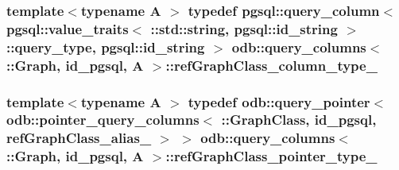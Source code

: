\subsubsection[{ref\+Graph\+Class\+\_\+column\+\_\+type\+\_\+}]{\setlength{\rightskip}{0pt plus 5cm}template$<$typename A $>$ typedef pgsql\+::query\+\_\+column$<$ pgsql\+::value\+\_\+traits$<$ \+::std\+::string, pgsql\+::id\+\_\+string $>$\+::query\+\_\+type, pgsql\+::id\+\_\+string $>$ odb\+::query\+\_\+columns$<$ \+::{\bf Graph}, id\+\_\+pgsql, A $>$\+::{\bf ref\+Graph\+Class\+\_\+column\+\_\+type\+\_\+}}\label{structodb_1_1query__columns_3_01_1_1_graph_00_01id__pgsql_00_01_a_01_4_a4acfad79ba5834b07df2fca207c93284}
\hypertarget{structodb_1_1query__columns_3_01_1_1_graph_00_01id__pgsql_00_01_a_01_4_a4b2c76decf6a3ad49cf2b4c10f5d0e41}{}
\subsubsection[{ref\+Graph\+Class\+\_\+pointer\+\_\+type\+\_\+}]{\setlength{\rightskip}{0pt plus 5cm}template$<$typename A $>$ typedef odb\+::query\+\_\+pointer$<$ odb\+::pointer\+\_\+query\+\_\+columns$<$ \+::{\bf Graph\+Class}, id\+\_\+pgsql, {\bf ref\+Graph\+Class\+\_\+alias\+\_\+} $>$ $>$ odb\+::query\+\_\+columns$<$ \+::{\bf Graph}, id\+\_\+pgsql, A $>$\+::{\bf ref\+Graph\+Class\+\_\+pointer\+\_\+type\+\_\+}}\label{structodb_1_1query__columns_3_01_1_1_graph_00_01id__pgsql_00_01_a_01_4_a4b2c76decf6a3ad49cf2b4c10f5d0e41}
\hypertarget{structodb_1_1query__columns_3_01_1_1_graph_00_01id__pgsql_00_01_a_01_4_abdd48668c97ac95a12e1fc0d1b49e7ee}{}
